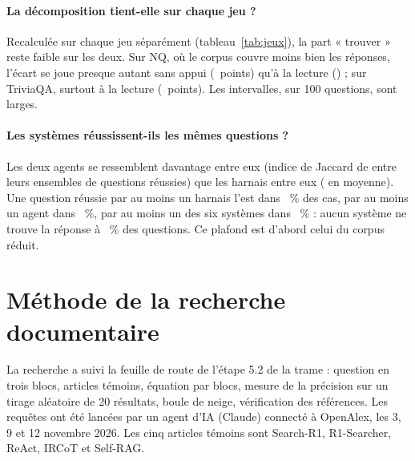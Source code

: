 \paragraph{La décomposition tient-elle sur chaque jeu ?} Recalculée sur chaque jeu séparément (tableau~\ref{tab:jeux}), la part « trouver » reste faible sur les deux. Sur NQ, où le corpus couvre moins bien les réponses, l'écart se joue presque autant sans appui (~points) qu'à la lecture () ; sur TriviaQA, surtout à la lecture (~points). Les intervalles, sur 100 questions, sont larges.

\begin{table}[ht]
\centering\small

\caption{Décomposition de l'écart d'EM entre agents et harnais, jeu par jeu, en points ; intervalle bootstrap à 95~\% sur les 100 questions du jeu.}
\label{tab:jeux}
\end{table}

\paragraph{Les systèmes réussissent-ils les mêmes questions ?} Les deux agents se ressemblent davantage entre eux (indice de Jaccard de  entre leurs ensembles de questions réussies) que les harnais entre eux ( en moyenne). Une question réussie par au moins un harnais l'est dans ~\% des cas, par au moins un agent dans ~\%, par au moins un des six systèmes dans ~\% : aucun système ne trouve la réponse à ~\% des questions. Ce plafond est d'abord celui du corpus réduit.

\FloatBarrier
\FloatBarrier

\section{Méthode de la recherche documentaire}\label{ann:requetes}

La recherche a suivi la feuille de route de l'étape 5.2 de la trame : question en trois blocs, articles témoins, équation par blocs, mesure de la précision sur un tirage aléatoire de 20 résultats, boule de neige, vérification des références. Les requêtes ont été lancées par un agent d'IA (Claude) connecté à OpenAlex, les 3, 9 et 12 novembre 2026. Les cinq articles témoins sont Search-R1, R1-Searcher, ReAct, IRCoT et Self-RAG.


